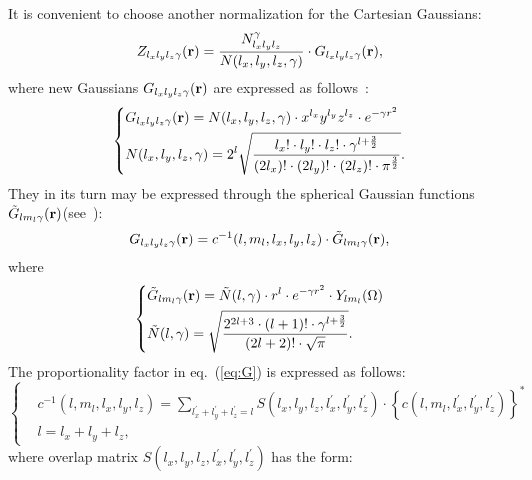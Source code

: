 \documentclass[12pt,openright,twoside,headsepline,bibtotoc]{scrbook}
\begin{document}
It is convenient to choose another normalization for the Cartesian Gaussians:
%
\begin{equation}
Z_{l_x l_y l_z \gamma}(\mathbf{r}) = \frac{N^\gamma_{l_x l_y l_z}}{N(l_x, l_y, l_z, \gamma)} \cdot G_{l_x l_y l_z \gamma}(\mathbf{r}) ,
\label{eq:Z}
\end{equation}
%
where new Gaussians $G_{l_x l_y l_z \gamma}(\mathbf{r})$ are expressed as follows~\cite{Frisch:95}:
%
\begin{equation}
\left\{
\begin{aligned}
&G_{l_x l_y l_z \gamma}(\mathbf{r}) = N(l_x, l_y, l_z, \gamma) \cdot x^{l_x} y^{l_y} z^{l_z} \cdot e^{-\gamma r^2}
\\
&N(l_x, l_y, l_z, \gamma) = 2^l \sqrt{ \frac{ l_x! \cdot l_y! \cdot l_z! \cdot \gamma^{l + \frac{3}{2}}}{(2 l_x)! \cdot (2 l_y)! \cdot (2 l_z)! \cdot  \pi^\frac{3}{2}} } .
\end{aligned}
\right.
\end{equation}
%
They in its turn may be expressed through the spherical Gaussian functions $\tilde G_{l m_l \gamma}(\mathbf{r})$(see~\cite{Frisch:95}):
%
\begin{equation}
G_{l_x l_y l_z \gamma}(\mathbf{r}) = c^{-1}(l, m_l, l_x, l_y, l_z) \cdot \tilde G_{l m_l \gamma}(\mathbf{r}) ,
\label{eq:G}
\end{equation}
%
where
%
\begin{equation}
\left\{
\begin{aligned}
&\tilde G_{l m_l \gamma}(\mathbf{r}) = \tilde N(l, \gamma) \cdot r^l \cdot e^{-\gamma r^2} \cdot Y_{l m_l}(\Omega)
\\
&\tilde N(l, \gamma) = \sqrt{ \frac{2^{2l+3} \cdot (l+1)! \cdot \gamma^{l+\frac{3}{2}}}{(2l+2)! \cdot \sqrt{\pi}} } .
\end{aligned}
\right.
\label{eq:tilde_G}
\end{equation}
%
The proportionality factor in eq.~(\ref{eq:G}) is expressed as follows:
%
\begin{equation}
\left\{
\begin{aligned}
&c^{-1}(l, m_l, l_x, l_y, l_z) = \sum_{l_x^\prime + l_y^\prime + l_z^\prime = l} S(l_x, l_y, l_z, l_x^\prime, l_y^\prime, l_z^\prime) \cdot \left\{ c(l, m_l, l_x^\prime, l_y^\prime, l_z^\prime) \right\}^\ast
\\
&l = l_x + l_y + l_z ,
\end{aligned}
\right.
\end{equation}
%
where overlap matrix $S(l_x, l_y, l_z, l_x^\prime, l_y^\prime, l_z^\prime)$ has the form:
%
\end{document}
